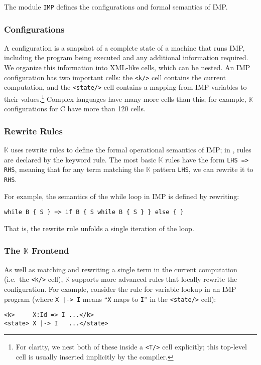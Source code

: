\documentclass{article}
\theoremstyle{definition}
\newcommand{\K}{$\mathbb{K}$\xspace}
\newcommand{\code}[1]{{\small \ttfamily #1}}
\newcommand{\kcode}[1]{\texttt{#1}}
\newcommand{\IMP}{\textsf{IMP}\xspace}
\newcommand{\cell}[1]{\kcode{<#1/>}}
\begin{document}
The module \kcode{IMP} defines the configurations and formal semantics
of \IMP.

\subsubsection{Configurations}

A configuration is a snapshot of a complete state of a machine that runs \IMP,
including the program being executed and any additional information required. We
organize this information into XML-like cells, which can be nested. An \IMP
configuration has two important cells: the \cell{k} cell contains the current
computation, and the \cell{state} cell contains a mapping from \IMP variables to
their values.\footnote{For clarity, we nest both of these inside a \cell{T} cell
  explicitly; this top-level cell is usually inserted implicitly by the
compiler.} Complex languages have many more cells than this; for example, \K
configurations for C \cite{ECR12} have more than 120 cells.

\subsubsection{Rewrite Rules}

\K uses rewrite rules to define the formal operational semantics of \IMP; in
, rules are declared by the keyword \code{rule}. The most basic
\K rules have the form \kcode{LHS => RHS}, meaning that for any term matching
the \K pattern \kcode{LHS}, we can rewrite it to \kcode{RHS}.

For example, the semantics of the while loop in \IMP is defined by rewriting:
\begin{lstlisting}[language=K,numbers=none,frame=none,basicstyle=\footnotesize]
while B { S } => if B { S while B { S } } else { }
\end{lstlisting}
That is, the rewrite rule unfolds a single iteration of the loop.


\subsubsection{The \K Frontend}

As well as matching and rewriting a single term in the current computation
(i.e.\ the \cell{k} cell), \K supports more advanced rules that locally rewrite
the configuration. For example, consider the rule for variable lookup in an \IMP
program (where \kcode{X |-> I} means ``\kcode{X} maps to \kcode{I}'' in the
\cell{state} cell):
\begin{lstlisting}[language=K,numbers=none,frame=none,basicstyle=\footnotesize]
<k>     X:Id => I ...</k>
<state> X |-> I   ...</state>
\end{lstlisting}
\end{document}
